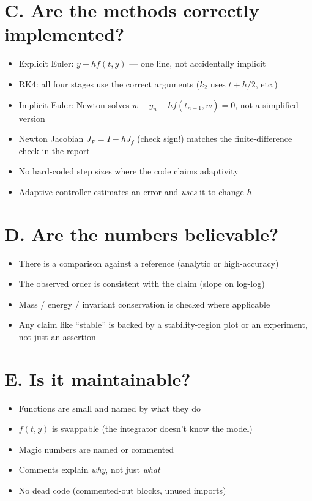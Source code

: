\documentclass[11pt]{article}
\begin{document}
\section*{C. Are the methods correctly implemented?}
\begin{itemize}[leftmargin=2.4em, itemsep=1pt]
  \item[$\square$] Explicit Euler: $y + h f(t, y)$ --- one line, not accidentally implicit
  \item[$\square$] RK4: all four stages use the correct arguments ($k_2$ uses $t+h/2$, etc.)
  \item[$\square$] Implicit Euler: Newton solves $w - y_n - h f(t_{n+1}, w) = 0$, not a
    simplified version
  \item[$\square$] Newton Jacobian $J_F = I - h J_f$ (check sign!) matches the
    finite-difference check in the report
  \item[$\square$] No hard-coded step sizes where the code claims adaptivity
  \item[$\square$] Adaptive controller estimates an error and \emph{uses} it to change $h$
\end{itemize}

\section*{D. Are the numbers believable?}
\begin{itemize}[leftmargin=2.4em, itemsep=1pt]
  \item[$\square$] There is a comparison against a reference (analytic or high-accuracy)
  \item[$\square$] The observed order is consistent with the claim (slope on log-log)
  \item[$\square$] Mass / energy / invariant conservation is checked where applicable
  \item[$\square$] Any claim like ``stable'' is backed by a stability-region plot or an
    experiment, not just an assertion
\end{itemize}

\section*{E. Is it maintainable?}
\begin{itemize}[leftmargin=2.4em, itemsep=1pt]
  \item[$\square$] Functions are small and named by what they do
  \item[$\square$] $f(t, y)$ is swappable (the integrator doesn't know the model)
  \item[$\square$] Magic numbers are named or commented
  \item[$\square$] Comments explain \emph{why}, not just \emph{what}
  \item[$\square$] No dead code (commented-out blocks, unused imports)
\end{itemize}
\end{document}
